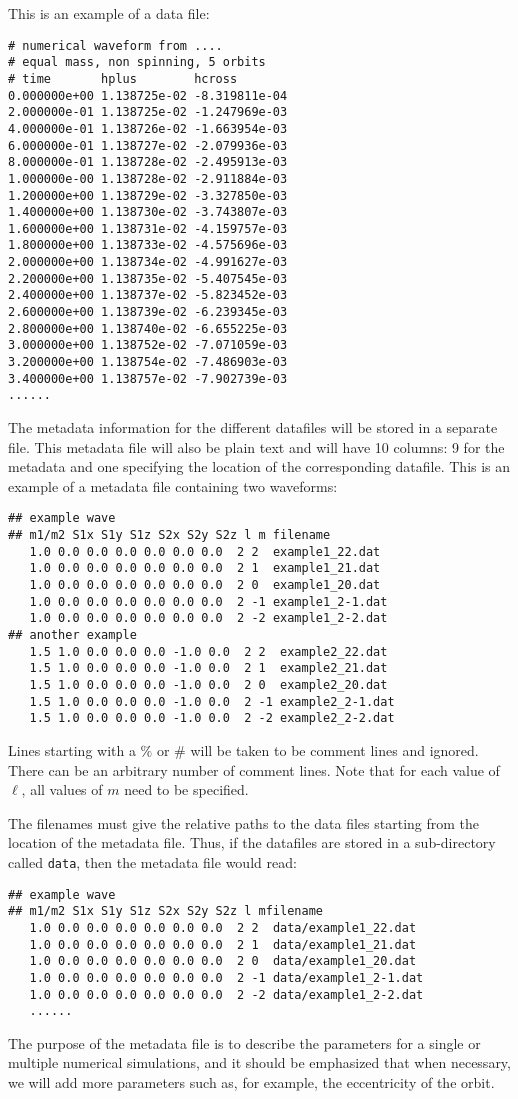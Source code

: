 \documentclass{article}
\numberwithin{equation}{section}
\begin{document}
This is an example of a data file:

\begin{verbatim}
# numerical waveform from ....
# equal mass, non spinning, 5 orbits
# time       hplus        hcross
0.000000e+00 1.138725e-02 -8.319811e-04
2.000000e-01 1.138725e-02 -1.247969e-03
4.000000e-01 1.138726e-02 -1.663954e-03
6.000000e-01 1.138727e-02 -2.079936e-03
8.000000e-01 1.138728e-02 -2.495913e-03
1.000000e-00 1.138728e-02 -2.911884e-03
1.200000e+00 1.138729e-02 -3.327850e-03
1.400000e+00 1.138730e-02 -3.743807e-03
1.600000e+00 1.138731e-02 -4.159757e-03
1.800000e+00 1.138733e-02 -4.575696e-03
2.000000e+00 1.138734e-02 -4.991627e-03
2.200000e+00 1.138735e-02 -5.407545e-03
2.400000e+00 1.138737e-02 -5.823452e-03
2.600000e+00 1.138739e-02 -6.239345e-03
2.800000e+00 1.138740e-02 -6.655225e-03
3.000000e+00 1.138752e-02 -7.071059e-03
3.200000e+00 1.138754e-02 -7.486903e-03
3.400000e+00 1.138757e-02 -7.902739e-03
......
\end{verbatim}

The metadata information for the different datafiles will be stored in
a separate file.  This metadata file will also be plain text and
will have 10 columns: 9 for the metadata and one specifying
the location of the corresponding datafile.  This is an example of a
metadata file containing two waveforms:
\begin{verbatim}
## example wave
## m1/m2 S1x S1y S1z S2x S2y S2z l m filename
   1.0 0.0 0.0 0.0 0.0 0.0 0.0  2 2  example1_22.dat
   1.0 0.0 0.0 0.0 0.0 0.0 0.0  2 1  example1_21.dat
   1.0 0.0 0.0 0.0 0.0 0.0 0.0  2 0  example1_20.dat
   1.0 0.0 0.0 0.0 0.0 0.0 0.0  2 -1 example1_2-1.dat
   1.0 0.0 0.0 0.0 0.0 0.0 0.0  2 -2 example1_2-2.dat
## another example
   1.5 1.0 0.0 0.0 0.0 -1.0 0.0  2 2  example2_22.dat
   1.5 1.0 0.0 0.0 0.0 -1.0 0.0  2 1  example2_21.dat
   1.5 1.0 0.0 0.0 0.0 -1.0 0.0  2 0  example2_20.dat
   1.5 1.0 0.0 0.0 0.0 -1.0 0.0  2 -1 example2_2-1.dat
   1.5 1.0 0.0 0.0 0.0 -1.0 0.0  2 -2 example2_2-2.dat
\end{verbatim}

Lines starting with a $\%$ or $\#$ will be taken to be comment lines and
ignored.  There can be an arbitrary number of comment lines.  Note
that for each value of $\ell$, all values of $m$ need to be specified.

The filenames must give the relative paths to the data files starting
from the location of the metadata file.  Thus, if the datafiles are
stored in a sub-directory called \texttt{data}, then the metadata file
would read:
\begin{verbatim}
## example wave
## m1/m2 S1x S1y S1z S2x S2y S2z l mfilename     
   1.0 0.0 0.0 0.0 0.0 0.0 0.0  2 2  data/example1_22.dat
   1.0 0.0 0.0 0.0 0.0 0.0 0.0  2 1  data/example1_21.dat
   1.0 0.0 0.0 0.0 0.0 0.0 0.0  2 0  data/example1_20.dat
   1.0 0.0 0.0 0.0 0.0 0.0 0.0  2 -1 data/example1_2-1.dat
   1.0 0.0 0.0 0.0 0.0 0.0 0.0  2 -2 data/example1_2-2.dat
   ......
\end{verbatim}
The purpose of the metadata file is to describe the parameters for a
single or multiple numerical simulations, and it should be emphasized
that when necessary, we will add more parameters such as, for example,
the eccentricity of the orbit.
\end{document}
